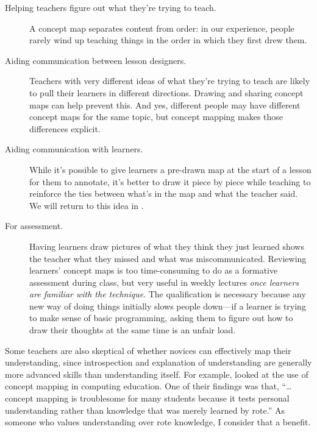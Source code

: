\begin{description}

\item[Helping teachers figure out what they're trying to teach.]
  A concept map separates content from order:
  in our experience,
  people rarely wind up teaching things in the order in which they first drew them.

\item[Aiding communication between lesson designers.]
  Teachers with very different ideas of what they're trying to teach
  are likely to pull their learners in different directions.
  Drawing and sharing concept maps can help prevent this.
  And yes,
  different people may have different concept maps for the same topic,
  but concept mapping makes those differences explicit.

\item[Aiding communication with learners.]
  While it's possible to give learners a pre-drawn map at the start of a lesson for them to annotate,
  it's better to draw it piece by piece while teaching
  to reinforce the ties between what's in the map and what the teacher said.
  We will return to this idea in .

\item[For assessment.]
  Having learners draw pictures of what they think they just learned
  shows the teacher what they missed and what was miscommunicated.
  Reviewing learners' concept maps is too time-consuming to do as a formative assessment during class,
  but very useful in weekly lectures \emph{once learners are familiar with the technique}.
  The qualification is necessary because
  any new way of doing things initially slows people down---if a learner is trying to make sense of basic programming,
  asking them to figure out how to draw their thoughts at the same time is an unfair load.

\end{description}

Some teachers are also skeptical of whether novices can effectively map their understanding,
since introspection and explanation of understanding are generally more advanced skills than understanding itself.
For example,
\cite{Kepp2008} looked at the use of concept mapping in computing education.
One of their findings was that,
``{\ldots}concept mapping is troublesome for many students because
it tests personal understanding rather than knowledge that was merely learned by rote.''
As someone who values understanding over rote knowledge,
I consider that a benefit.

